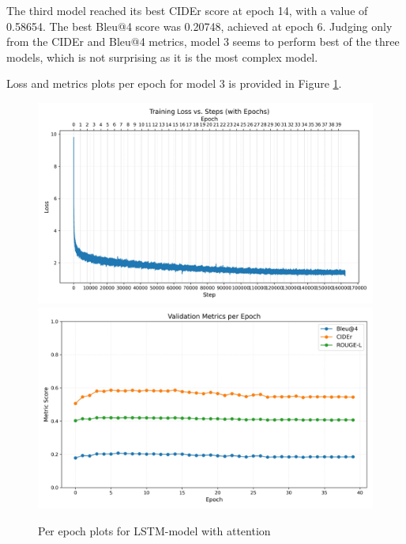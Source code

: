 The third model reached its best CIDEr score at epoch 14, with a value of 0.58654.
The best Bleu@4 score was 0.20748, achieved at epoch 6.
Judging only from the CIDEr and Bleu@4 metrics, model 3 seems to perform best of the three models, which is not surprising as it is the most complex model.

Loss and metrics plots per epoch for model 3 is provided in Figure \ref{fig:plot_model3}.

\begin{figure}[H]
    \centering
    \includegraphics[width=0.8\linewidth]{Figures/model3_loss.jpg}
    \includegraphics[width=0.8\linewidth]{Figures/model3_metrics.jpg}
    \caption{Per epoch plots for LSTM-model with attention}
    \label{fig:plot_model3}
\end{figure}




